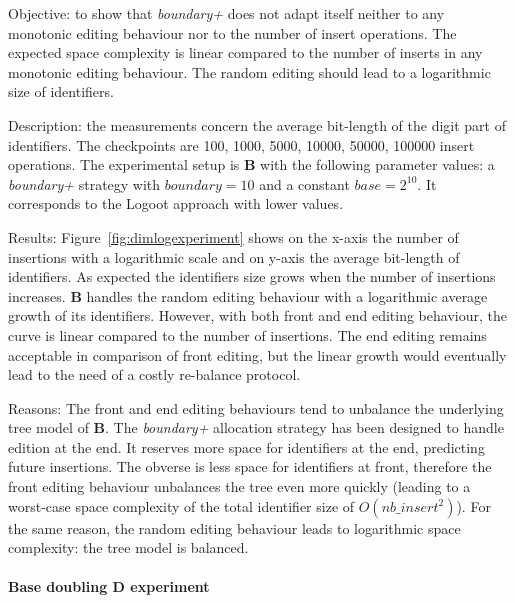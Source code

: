 \begin{asparadesc}
\item[Objective:] to show that \emph{boundary+} does not adapt itself neither
  to any monotonic editing behaviour nor to the number of insert
  operations. The expected space complexity is linear compared to the number of
  inserts in any monotonic editing behaviour. The random editing should lead to
  a logarithmic size of identifiers.

\item[Description:] the measurements concern the average bit-length of the
  digit part of identifiers. The checkpoints are 100, 1000, 5000, 10000, 50000,
  100000 insert operations. The experimental setup is \textbf{B} with the
  following parameter values: a \emph{boundary+} strategy with $boundary=10$
  and a constant $base=2^{10}$. It corresponds to the Logoot approach with
  lower values.

\item[Results:] Figure~\ref{fig:dimlogexperiment} shows on the x-axis
  the number of insertions with a logarithmic scale and on y-axis the
  average bit-length of identifiers. As expected the identifiers size
  grows when the number of insertions increases. \textbf{B} handles
  the random editing behaviour with a logarithmic average growth of
  its identifiers. However, with both front and end editing
  behaviour, the curve is linear compared to the number of insertions.
  The end editing remains acceptable in comparison of front editing,
  but the linear growth would eventually lead to the need of a costly
  re-balance protocol.

\item[Reasons:] The front and end editing behaviours tend to unbalance the
  underlying tree model of \textbf{B}. The \emph{boundary+} allocation strategy
  has been designed to handle edition at the end. It reserves more space
  for identifiers at the end, predicting future insertions. The obverse is less
  space for identifiers at front, therefore the front editing behaviour
  unbalances the tree even more quickly (leading to a worst-case space
  complexity of the total identifier size of $O(nb\_insert^2)$). For the same
  reason, the random editing behaviour leads to logarithmic space complexity:
  the tree model is balanced.
\end{asparadesc}

\paragraph{Base doubling \textbf{D} experiment}

